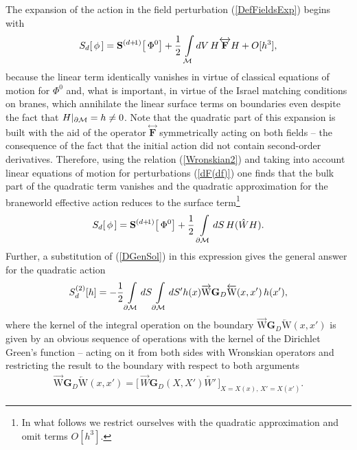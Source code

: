 \documentclass[a4paper,12pt]{article}
\newcommand{\ddim}{{d}}
\newcommand{\DDim}{{(d+\!1)}}
\newcommand{\M}{{\cal M}}
\newcommand{\dM}{{\partial \cal M}}
\newcommand{\htt}{{h}}   %
\newcommand{\GrD}{ \mathbf{G}_{D}}  %
\newcommand{\NGrDN}{\overrightarrow{\mathrm{W}}\mathbf{G}_{D}\overleftarrow{\mathrm{W}}} %
\newcommand{\RnGrDnR}{{\NGrDN}} %
\newcommand{\dS}{dS}
\begin{document}
The expansion of the action in the field perturbation (\ref{DefFieldsExp})
begins with
    \begin{eqnarray}
     S_d[\,\phi\,]
    =\mathbf{S}^\DDim\big[\,\Phi^0\big]
     +\frac12\,\int\limits_{\M} dV\,
    H\overleftrightarrow{\mathbf F}H
    +O[h^3],                          \label{DefBWEAPertExp}
    \end{eqnarray}
because the linear term identically vanishes in virtue of
classical equations of motion for $\Phi^0$ and, what is important,
in virtue of the Israel matching conditions on branes, which
annihilate the linear surface terms on boundaries even despite the
fact that $H|_{\dM}=h\neq 0$. Note that the quadratic part of this
expansion is built with the aid of the operator
$\stackrel{\leftrightarrow}{\mathbf F}$ symmetrically acting on
both fields -- the consequence of the fact that the initial action
did not contain second-order derivatives. Therefore, using the
relation (\ref{Wronskian2}) and taking into account linear
equations of motion for perturbations (\ref{dF(df)}) one finds
that the bulk part of the quadratic term vanishes and the
quadratic approximation for the braneworld effective action
reduces to the surface term\footnote{In what follows we restrict
ourselves with the quadratic approximation and omit terms
$O[h^3]$.}
    \begin{eqnarray}
     S_{\ddim}[\,\phi\,]
     =\mathbf{S}^\DDim\big[\,\Phi^0\big]
     +\frac12\,\int\limits_{\dM} \dS\,
     H(\hat W H).          \label{DefBWEAPertExp2}
    \end{eqnarray}
Further, a substitution of (\ref{DGenSol}) in this expression
gives the general answer for the quadratic action
    \begin{eqnarray}
     S_{\ddim}^{(2)}[\htt]= -\frac12 \int
     \limits_{\dM}\dS\int\limits_{\dM}\dS'
     h(x){\RnGrDnR}(x,x')\,
     h(x'),                        \label{DActionFinal0}
    \end{eqnarray}
where the kernel of the integral operation on the boundary
${\RnGrDnR}(x,x')$ is given by an obvious sequence of operations with the
kernel of the Dirichlet Green's function -- acting on it from both sides
with Wronskian operators and restricting the result to the boundary
with respect to both arguments
    \begin{eqnarray}
     {\RnGrDnR}(x,x')=\Big[\,\overrightarrow{W}\GrD(X,X')
     \overleftarrow{W'}\,\Big]_{X=X(x),\,X'=X(x')}.
    \end{eqnarray}
\end{document}
